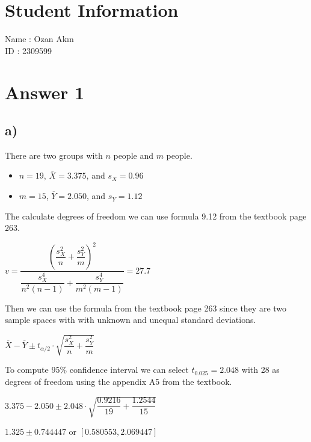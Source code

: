 \documentclass[12pt]{article}
\begin{document}
\section*{Student Information}

Name : Ozan Akın \\

ID : 2309599 \\


\section*{Answer 1}
\subsection*{a)}
    There are two groups with $n$ people and $m$ people.
    
    \begin{itemize}
        \item $n = 19$, $\overline{X} = 3.375$, and $s_{X}=0.96$
        \item $m = 15$, $\overline{Y} = 2.050$, and $s_{Y}=1.12$
    \end{itemize}
    
    The calculate degrees of freedom we can use formula 9.12 from the textbook page 263.
    
    \begin{center}
        $v = \dfrac{(\dfrac{s_X^2}{n} + \dfrac{s_Y^2}{m})^2}{\dfrac{s_X^4}{n^2(n-1)} + \dfrac{s_Y^4}{m^2(m-1)}} = 27.7$
    \end{center}
    
    Then we can use the formula from the textbook page 263 since they are two sample spaces with with unknown and unequal standard deviations.
    
    \begin{center}
        $\overline{X} - \overline{Y} \pm t_{\alpha / 2} \cdot \sqrt{\dfrac{s_X^2}{n} + \dfrac{s_Y^2}{m}}$
    \end{center}
    
    To compute 95\% confidence interval we can select $t_{0.025} = 2.048$ with 28 as degrees of freedom using the appendix A5 from the textbook.
    
    \begin{center}
        $3.375 - 2.050 \pm 2.048 \cdot \sqrt{\dfrac{0.9216}{19} + \dfrac{1.2544}{15}}$
    \end{center}
    
    \begin{center}
        $1.325 \pm 0.744447$ or $[0.580553, 2.069447]$
    \end{center}
    
\end{document}
